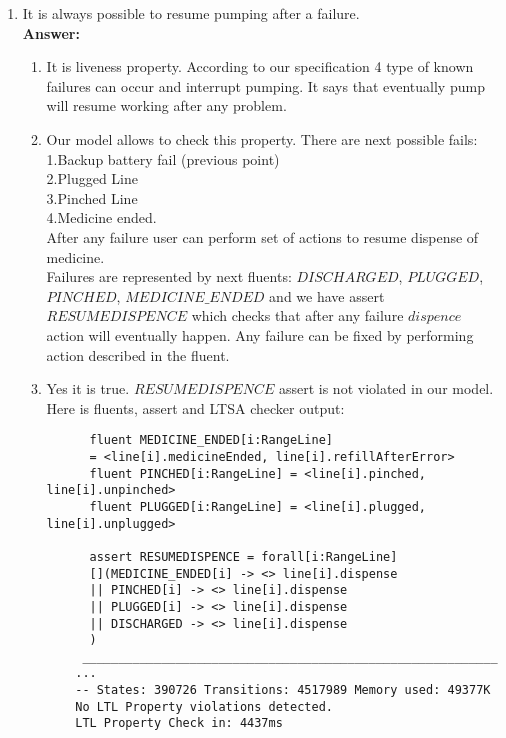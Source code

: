 \documentclass{article}
\begin{document}
\begin{enumerate}
    \item It is always possible to resume pumping after a failure.\\
    \textbf{Answer:}
    \begin{enumerate}
    \item It is liveness property. According to our specification 4 type of known failures can occur and interrupt
    pumping. It says that eventually pump will resume working after any problem. 
    \item Our model allows to check this property. 
    There are next possible fails:\\
    1.Backup battery fail (previous point)\\
    2.Plugged Line \\
    3.Pinched Line \\
    4.Medicine ended.\\
    After any failure user can perform set of actions to resume dispense of medicine. \\ Failures are represented by next fluents: $DISCHARGED$, $PLUGGED$, $PINCHED$, $MEDICINE\_ENDED$ and we have assert $RESUMEDISPENCE$ which checks that after any failure $dispence$ action will eventually happen. Any failure can be fixed by performing action described in the fluent.\\   
    \item Yes it is true. $RESUMEDISPENCE$ assert is not violated in our model. Here is fluents, assert and LTSA checker output:
      \begin{verbatim}
      fluent MEDICINE_ENDED[i:RangeLine] 
      = <line[i].medicineEnded, line[i].refillAfterError>
      fluent PINCHED[i:RangeLine] = <line[i].pinched, line[i].unpinched>
      fluent PLUGGED[i:RangeLine] = <line[i].plugged, line[i].unplugged>
      
      assert RESUMEDISPENCE = forall[i:RangeLine]
      [](MEDICINE_ENDED[i] -> <> line[i].dispense
      || PINCHED[i] -> <> line[i].dispense
      || PLUGGED[i] -> <> line[i].dispense
      || DISCHARGED -> <> line[i].dispense
      )
     __________________________________________________________
    ...
    -- States: 390726 Transitions: 4517989 Memory used: 49377K
    No LTL Property violations detected.
    LTL Property Check in: 4437ms
    \end{verbatim} 
    \end{enumerate}    
    

\end{enumerate}
\end{document}
